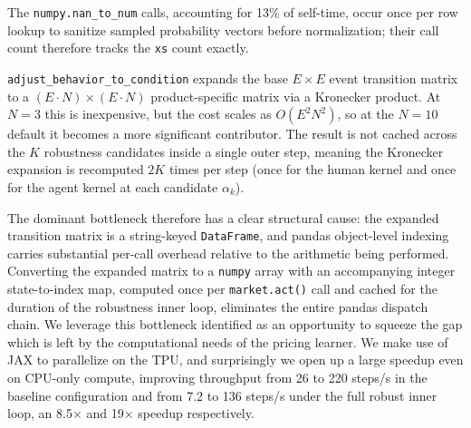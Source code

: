 The \texttt{numpy.nan\_to\_num} calls, accounting for 13\% of self-time, occur once per row lookup to sanitize sampled probability vectors before normalization; their call count therefore tracks the \texttt{xs} count exactly.

\texttt{adjust\_behavior\_to\_condition} expands the base $E \times E$ event transition matrix to a $(E \cdot N) \times (E \cdot N)$ product-specific matrix via a Kronecker product. At $N=3$ this is inexpensive, but the cost scales as $O(E^2 N^2)$, so at the $N=10$ default it becomes a more significant contributor. The result is not cached across the $K$ robustness candidates inside a single outer step, meaning the Kronecker expansion is recomputed $2K$ times per step (once for the human kernel and once for the agent kernel at each candidate $\alpha_k$).

The dominant bottleneck therefore has a clear structural cause: the expanded transition matrix is a string-keyed \texttt{DataFrame}, and pandas object-level indexing carries substantial per-call overhead relative to the arithmetic being performed. Converting the expanded matrix to a \texttt{numpy} array with an accompanying integer state-to-index map, computed once per \texttt{market.act()} call and cached for the duration of the robustness inner loop, eliminates the entire pandas dispatch chain. We leverage this bottleneck identified as an opportunity to squeeze the gap which is left by the computational needs of the pricing learner. We make use of JAX to parallelize on the TPU, and surprisingly we open up a large speedup even on CPU-only compute, improving throughput from 26 to 220 steps/s in the baseline configuration and from 7.2 to 136 steps/s under the full robust inner loop, an 8.5$\times$ and 19$\times$ speedup respectively.
